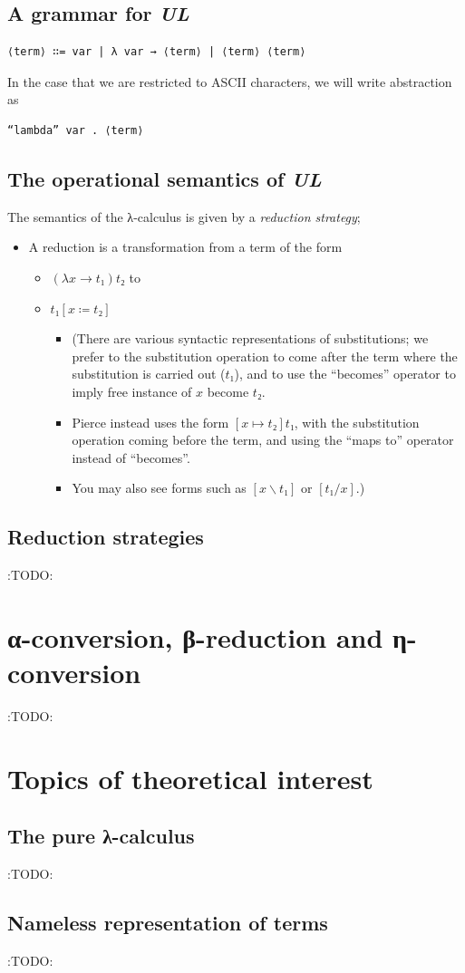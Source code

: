 \documentclass[11pt]{article}
\theoremstyle{definition}
\begin{document}
\subsection{A grammar for \emph{UL}}
\label{sec:org0b5b636}
\begin{verbatim}
⟨term⟩ ∷= var | λ var → ⟨term⟩ | ⟨term⟩ ⟨term⟩
\end{verbatim}

In the case that we are restricted to ASCII characters,
we will write abstraction as
\begin{verbatim}
“lambda” var . ⟨term⟩
\end{verbatim}

\subsection{The operational semantics of \emph{UL}}
\label{sec:orgd79edee}
The semantics of the λ-calculus is given by a \emph{reduction strategy};
\begin{itemize}
\item A reduction is a transformation from a term of the form
\begin{itemize}
\item \((λ x → t₁) t₂\) to
\item \(t₁[x ≔ t₂]\)
\begin{itemize}
\item (There are various syntactic representations of substitutions;
we prefer to the substitution operation to come after the term
where the substitution is carried out (\(t₁\)), and to use
the “becomes” operator to imply free instance of \(x\) become \(t₂\).
\item Pierce instead uses the form \([x ↦ t₂]t₁\), with the
substitution operation coming before the term,
and using the “maps to” operator instead of “becomes”.
\item You may also see forms such as \([x\backslash t₁]\) or \([t₁/x]\).)
\end{itemize}
\end{itemize}
\end{itemize}

\subsection{Reduction strategies}
\label{sec:orgb0b18a6}
:TODO:

\section{α-conversion, β-reduction and η-conversion}
\label{sec:org5f53bfa}
:TODO:

\section{Topics of theoretical interest}
\label{sec:org11b6967}
\subsection{The pure λ-calculus}
\label{sec:org7265539}
:TODO:

\subsection{Nameless representation of terms}
\label{sec:orgd863e50}
:TODO:
\end{document}
